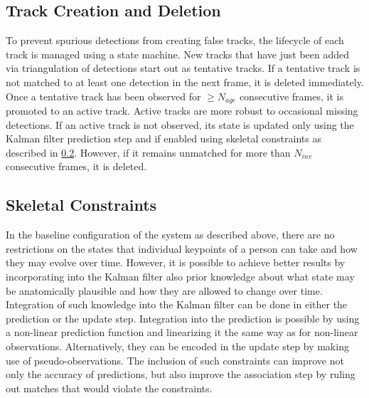 \subsection{Track Creation and Deletion} \label{arch-tracks}

To prevent spurious detections from creating false tracks, the lifecycle of each track is managed using a state machine. New tracks that have just been added via triangulation of detections start out as tentative tracks. If a tentative track is not matched to at least one detection in the next frame, it is deleted immediately. Once a tentative track has been observed for $\ge N_{age}$ consecutive frames, it is promoted to an active track. Active tracks are more robust to occasional missing detections. If an active track is not observed, its state is updated only using the Kalman filter prediction step and if enabled using skeletal constraints as described in \cref{arch-constraints}. However, if it remains unmatched for more than $N_{inv}$ consecutive frames, it is deleted.


\subsection{Skeletal Constraints} \label{arch-constraints}

In the baseline configuration of the system as described above, there are no restrictions on the states that individual keypoints of a person can take and how they may evolve over time. However, it is possible to achieve better results by incorporating into the Kalman filter also prior knowledge about what state may be anatomically plausible and how they are allowed to change over time. Integration of such knowledge into the Kalman filter can be done in either the prediction or the update step. Integration into the prediction is possible by using a non-linear prediction function and linearizing it the same way as for non-linear observations. Alternatively, they can be encoded in the update step by making use of pseudo-observations. The inclusion of such constraints can improve not only the accuracy of predictions, but also improve the association step by ruling out matches that would violate the constraints.


